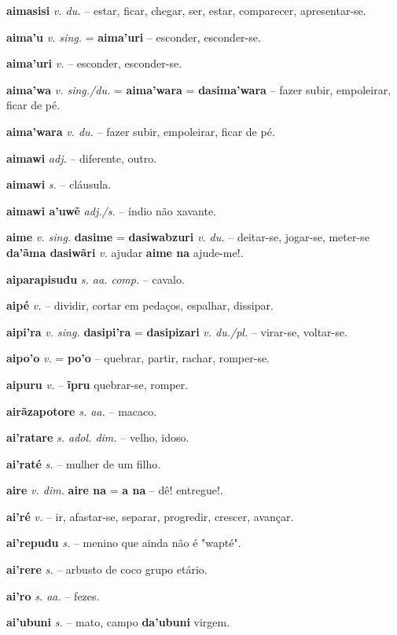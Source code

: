 \textbf{aimasisi} \textit{v. du.} -- estar, ficar, chegar, ser, estar, comparecer, apresentar-se.

\textbf{aima'u} \textit{v. sing.} = \textbf{aima'uri} -- esconder, esconder-se.

\textbf{aima'uri} \textit{v.} -- esconder, esconder-se.

\textbf{aima'wa} \textit{v. sing./du.} = \textbf{aima'wara} = \textbf{dasima'wara} -- fazer subir, empoleirar, ficar de pé.

\textbf{aima'wara} \textit{v. du.} -- fazer subir, empoleirar, ficar de pé.

\textbf{aimawi} \textit{adj.} -- diferente, outro.

\textbf{aimawi} \textit{s.} -- cláusula.

\textbf{aimawi a'uwẽ} \textit{adj./s.} -- índio não xavante.

\textbf{aime} \textit{v. sing.} \textbf{dasime} = \textbf{dasiwabzuri} \textit{v. du.} -- deitar-se, jogar-se, meter-se  \textbf{da'ãma dasiwãri} \textit{v.} ajudar  \textbf{aime na} ajude-me!.

\textbf{aiparapisudu} \textit{s. aa. comp.} -- cavalo.

\textbf{aipé} \textit{v.} -- dividir, cortar em pedaços, espalhar, dissipar.

\textbf{aipi'ra} \textit{v. sing.} \textbf{dasipi'ra} = \textbf{dasipizari} \textit{v. du./pl.} -- virar-se, voltar-se.

\textbf{aipo'o} \textit{v.} = \textbf{po'o} -- quebrar, partir, rachar, romper-se.

\textbf{aipuru} \textit{v.} -- \textbf{ĩpru} quebrar-se, romper.

\textbf{airãzapotore} \textit{s. aa.} -- macaco.

\textbf{ai'ratare} \textit{s. adol. dim.} -- velho, idoso.

\textbf{ai'raté} \textit{s.} -- mulher de um filho.

\textbf{aire} \textit{v. dim.} \textbf{aire na} = \textbf{a na} -- dê! entregue!.

\textbf{ai'ré} \textit{v.} -- ir, afastar-se, separar, progredir, crescer, avançar.

\textbf{ai'repudu} \textit{s.} -- menino que ainda não é "wapté".

\textbf{ai'rere} \textit{s.} -- arbusto de coco  grupo etário.

\textbf{ai'ro} \textit{s. aa.} -- fezes.

\textbf{ai'ubuni} \textit{s.} -- mato, campo  \textbf{da'ubuni} virgem.

